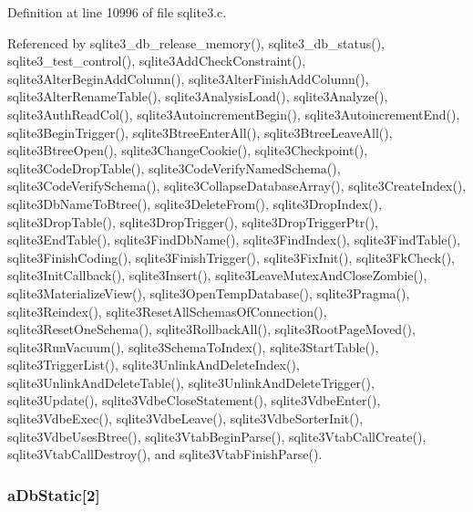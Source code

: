 Definition at line 10996 of file sqlite3.\+c.



Referenced by sqlite3\+\_\+db\+\_\+release\+\_\+memory(), sqlite3\+\_\+db\+\_\+status(), sqlite3\+\_\+test\+\_\+control(), sqlite3\+Add\+Check\+Constraint(), sqlite3\+Alter\+Begin\+Add\+Column(), sqlite3\+Alter\+Finish\+Add\+Column(), sqlite3\+Alter\+Rename\+Table(), sqlite3\+Analysis\+Load(), sqlite3\+Analyze(), sqlite3\+Auth\+Read\+Col(), sqlite3\+Autoincrement\+Begin(), sqlite3\+Autoincrement\+End(), sqlite3\+Begin\+Trigger(), sqlite3\+Btree\+Enter\+All(), sqlite3\+Btree\+Leave\+All(), sqlite3\+Btree\+Open(), sqlite3\+Change\+Cookie(), sqlite3\+Checkpoint(), sqlite3\+Code\+Drop\+Table(), sqlite3\+Code\+Verify\+Named\+Schema(), sqlite3\+Code\+Verify\+Schema(), sqlite3\+Collapse\+Database\+Array(), sqlite3\+Create\+Index(), sqlite3\+Db\+Name\+To\+Btree(), sqlite3\+Delete\+From(), sqlite3\+Drop\+Index(), sqlite3\+Drop\+Table(), sqlite3\+Drop\+Trigger(), sqlite3\+Drop\+Trigger\+Ptr(), sqlite3\+End\+Table(), sqlite3\+Find\+Db\+Name(), sqlite3\+Find\+Index(), sqlite3\+Find\+Table(), sqlite3\+Finish\+Coding(), sqlite3\+Finish\+Trigger(), sqlite3\+Fix\+Init(), sqlite3\+Fk\+Check(), sqlite3\+Init\+Callback(), sqlite3\+Insert(), sqlite3\+Leave\+Mutex\+And\+Close\+Zombie(), sqlite3\+Materialize\+View(), sqlite3\+Open\+Temp\+Database(), sqlite3\+Pragma(), sqlite3\+Reindex(), sqlite3\+Reset\+All\+Schemas\+Of\+Connection(), sqlite3\+Reset\+One\+Schema(), sqlite3\+Rollback\+All(), sqlite3\+Root\+Page\+Moved(), sqlite3\+Run\+Vacuum(), sqlite3\+Schema\+To\+Index(), sqlite3\+Start\+Table(), sqlite3\+Trigger\+List(), sqlite3\+Unlink\+And\+Delete\+Index(), sqlite3\+Unlink\+And\+Delete\+Table(), sqlite3\+Unlink\+And\+Delete\+Trigger(), sqlite3\+Update(), sqlite3\+Vdbe\+Close\+Statement(), sqlite3\+Vdbe\+Enter(), sqlite3\+Vdbe\+Exec(), sqlite3\+Vdbe\+Leave(), sqlite3\+Vdbe\+Sorter\+Init(), sqlite3\+Vdbe\+Uses\+Btree(), sqlite3\+Vtab\+Begin\+Parse(), sqlite3\+Vtab\+Call\+Create(), sqlite3\+Vtab\+Call\+Destroy(), and sqlite3\+Vtab\+Finish\+Parse().

\hypertarget{structsqlite3_ab73daca8f0609d56f177d0387cf7d5cc}{}
\subsubsection[{a\+Db\+Static}]{ a\+Db\+Static\mbox{[}2\mbox{]}}\label{structsqlite3_ab73daca8f0609d56f177d0387cf7d5cc}


